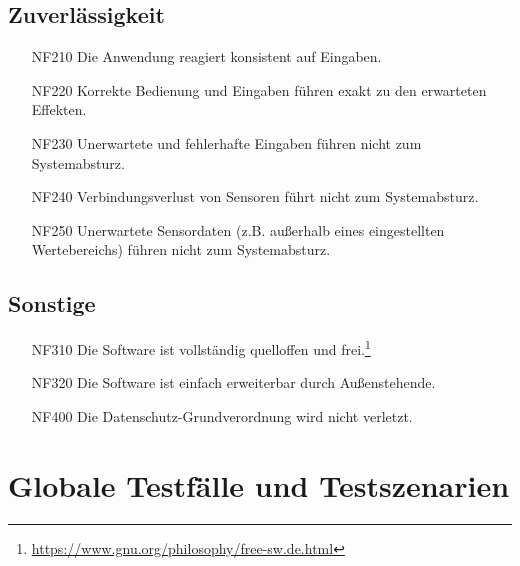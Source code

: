 \documentclass[parskip=full]{scrartcl}
\begin{document}
\subsection{Zuverlässigkeit}

\begin{itemize}

\item[NF210] Die Anwendung reagiert konsistent auf Eingaben.
\item[NF220] Korrekte Bedienung und Eingaben führen exakt zu den erwarteten Effekten.
\item[NF230] Unerwartete und fehlerhafte Eingaben führen nicht zum Systemabsturz.
\item[NF240] Verbindungsverlust von Sensoren führt nicht zum Systemabsturz.
\item[NF250] Unerwartete Sensordaten (z.B. außerhalb eines eingestellten Wertebereichs) führen nicht zum Systemabsturz.

\end{itemize}

\subsection{Sonstige}

\begin{itemize}

\item[NF310] Die Software ist vollständig quelloffen und frei.\footnote{\url{https://www.gnu.org/philosophy/free-sw.de.html}}
\item[NF320] Die Software ist einfach erweiterbar durch Außenstehende.
\item[NF400] Die Datenschutz-Grundverordnung wird nicht verletzt.

\end{itemize}

\section{Globale Testfälle und Testszenarien}
\end{document}
